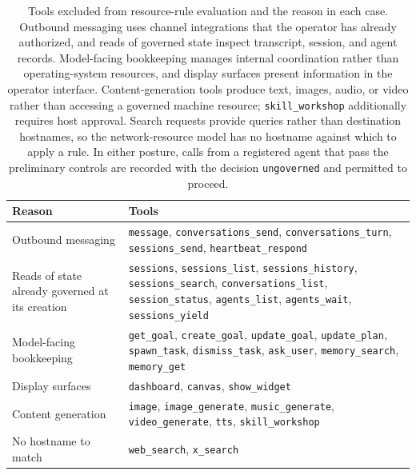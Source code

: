 \begin{table}[h]
\centering
\renewcommand{\arraystretch}{1.35}
\small
\begin{tabular}{@{}>{\raggedright\arraybackslash}p{3.5cm} >{\raggedright\arraybackslash}p{8.3cm}@{}}
\toprule
\textbf{Reason} & \textbf{Tools} \\
\midrule
Outbound messaging &
\texttt{message}, \texttt{conversations\_send}, \texttt{conversations\_turn},
\texttt{sessions\_send}, \texttt{heartbeat\_respond} \\
Reads of state already governed at its creation &
\texttt{sessions}, \texttt{sessions\_list}, \texttt{sessions\_history},
\texttt{sessions\_search}, \texttt{conversations\_list}, \texttt{session\_status},
\texttt{agents\_list}, \texttt{agents\_wait}, \texttt{sessions\_yield} \\
Model-facing bookkeeping &
\texttt{get\_goal}, \texttt{create\_goal}, \texttt{update\_goal},
\texttt{update\_plan}, \texttt{spawn\_task}, \texttt{dismiss\_task},
\texttt{ask\_user}, \texttt{memory\_search}, \texttt{memory\_get} \\
Display surfaces &
\texttt{dashboard}, \texttt{canvas}, \texttt{show\_widget} \\
Content generation &
\texttt{image}, \texttt{image\_generate}, \texttt{music\_generate},
\texttt{video\_generate}, \texttt{tts}, \texttt{skill\_workshop} \\
No hostname to match &
\texttt{web\_search}, \texttt{x\_search} \\
\bottomrule
\end{tabular}
\caption[Tools excluded from resource-rule evaluation]
{\footnotesize Tools excluded from resource-rule evaluation and the reason in
each case. Outbound messaging uses channel integrations that the operator has
already authorized, and reads of governed state inspect transcript, session,
and agent records. Model-facing bookkeeping manages internal coordination
rather than operating-system resources, and display surfaces present
information in the operator interface. Content-generation tools produce text,
images, audio, or video rather than accessing a governed machine resource;
\texttt{skill\_workshop} additionally requires host approval. Search requests
provide queries rather than destination hostnames, so the network-resource
{\color{red}model has no hostname against which to apply a rule.}
{\color{red}In either posture, calls from a registered agent that pass the
preliminary controls are recorded with the decision \texttt{ungoverned} and
permitted to proceed.}}
\label{tab:gov-ungoverned}
\end{table}


